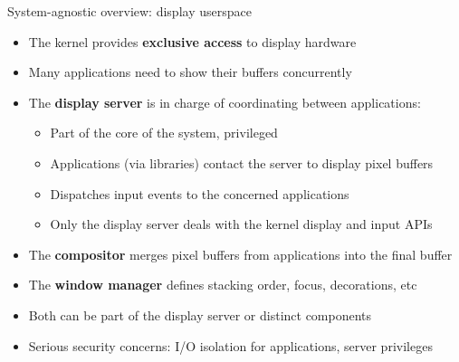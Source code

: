 \begin{frame}{System-agnostic overview: display userspace}
  \begin{itemize}
  \item The kernel provides \textbf{exclusive access} to display hardware
  \item Many applications need to show their buffers concurrently
  \item The \textbf{display server} is in charge of coordinating between applications:
    \begin{itemize}
    \item Part of the core of the system, privileged
    \item Applications (via libraries) contact the server to display pixel buffers
    \item Dispatches input events to the concerned applications
    \item Only the display server deals with the kernel display and input APIs
    \end{itemize}
  \item The \textbf{compositor} merges pixel buffers from applications into the final buffer
  \item The \textbf{window manager} defines stacking order, focus, decorations, etc
  \item Both can be part of the display server or distinct components
  \item Serious security concerns: I/O isolation for applications, server privileges
  \end{itemize}
\end{frame}

